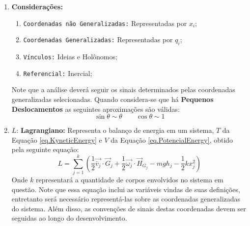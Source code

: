 \documentclass{article}
\begin{document}
                \begin{enumerate}[rightmargin = \leftmargin]
                    \item \textbf{Considerações:}
                        \begin{enumerate}[noitemsep]
                            \item \texttt{Coordenadas não Generalizadas:} Representadas por $x_{i}$;
                            \item \texttt{Coordenadas Generalizadas:} Representadas por $q_{i}$;
                            \item \texttt{Vínculos:} Ideias e Holônomos;
                            \item \texttt{Referencial:} Inercial;
                        \end{enumerate}
                    Note que a análise deverá seguir os sinais determinados pelas coordenadas generalizadas selecionadas. Quando considera-se que há \textbf{Pequenos Deslocamentos} as seguintes aproximações são válidas:
                        \begin{equation*}
                            \boxed{
                                \sin{\theta} \sim \theta
                            }
                            \qquad
                            \boxed{
                                \cos{\theta} \sim 1
                            }
                        \end{equation*}

                    \item $L$: \textbf{Lagrangiano:} Representa o balanço de energia em um sistema, $T$ da Equação \ref{eq.KyneticEnergy} e $V$ da Equação \ref{eq.PotencialEnergy}, obtido pela seguinte equação:
                        \begin{equation*}
                            L = 
                            \sum_{j=1}^{k} 
                            \left(
                                \frac{1}{2} \vec{\overline{v}_{j}}\cdot\vec{G}_{j} + 
                                \frac{1}{2}\vec{\omega_{j}}\cdot\vec{H}_{G_{j}} -
                                m g h_{j} -
                                \frac{1}{2} k x^{2}_{j}
                            \right)
                        \end{equation*}
                    Onde $k$ representará a quantidade de corpos envolvidos no sistema em questão. Note que essa equação inclui as variáveis vindas de suas definições, entretanto será necessário representá-las sobre as coordenadas generalizadas do sistema. Além disso, as convenções de sinais destas coordenadas devem ser seguidas ao longo do desenvolvimento.


\end{enumerate}
\end{document}
